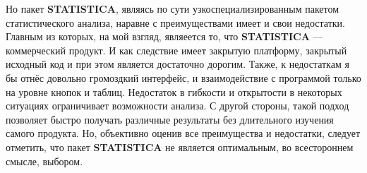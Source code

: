 Но пакет \textbf{STATISTICA}, являясь по сути узкоспециализированным пакетом статистического анализа, наравне с преимуществами имеет и свои недостатки. Главным из которых, на мой взгляд, являеется то, что \textbf{STATISTICA} --- коммерческий продукт. И как следствие имеет закрытую платформу, закрытый исходный код и при этом является достаточно дорогим. Также, к недостаткам я бы отнёс довольно громоздкий интерфейс, и взаимодействие с программой только на уровне кнопок и таблиц. Недостаток в гибкости и открытости в некоторых ситуациях ограничивает возможности анализа. С другой стороны, такой подход позволяет быстро получать различные результаты без длительного изучения самого продукта. Но, объективно оценив все преимущества и недостатки, следует отметить, что пакет \textbf{STATISTICA} не является оптимальным, во всестороннем смысле, выбором.

